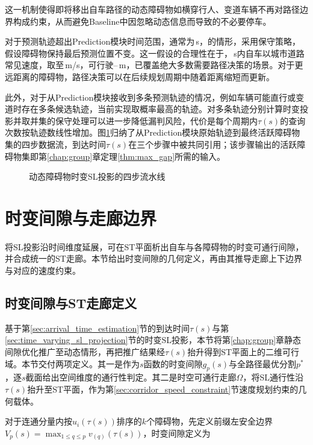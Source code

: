 这一机制使得即将移出自车路径的动态障碍物如横穿行人、变道车辆不再对路径边界构成约束，从而避免Baseline中因忽略动态信息而导致的不必要停车。

对于预测轨迹超出Prediction模块时间范围，通常为\PredictionHorizonSeconds\,s，的情形，采用保守策略，假设障碍物保持最后预测位置不变。这一假设的合理性在于，\PredictionHorizonSeconds\,s内自车以城市道路常见速度，取\CitySpeedMin 至\CitySpeedMax\,m/s，可行驶\PredictionDistanceMin--\PredictionDistanceMax\,m，已覆盖绝大多数需要路径决策的场景。对于更远距离的障碍物，路径决策可以在后续规划周期中随着距离缩短而更新。

此外，对于从Prediction模块接收到多条预测轨迹的情况，例如车辆可能直行或变道时存在多条候选轨迹，当前实现取概率最高的轨迹。对多条轨迹分别计算时变投影并取并集的保守处理可以进一步降低漏判风险，代价是每个周期内$\tau(s)$的查询次数按轨迹数线性增加。图\ref{fig:tvsl_pipeline}归纳了从Prediction模块原始轨迹到最终活跃障碍物集的四步数据流，到达时间$\tau(s)$在三个步骤中被共同引用；该步骤输出的活跃障碍物集即第\ref{chap:group}章定理\ref{thm:max_gap}所需的输入。

\begin{figure}[htbp]
\centering
{}
\caption{动态障碍物时变SL投影的四步流水线}
\label{fig:tvsl_pipeline}
\end{figure}

\section{时变间隙与走廊边界}
将SL投影沿时间维度延展，可在ST平面析出自车与各障碍物的时变可通行间隙，并合成统一的ST走廊。本节给出时变间隙的几何定义，再由其推导走廊上下边界与对应的速度约束。

\subsection{时变间隙与ST走廊定义}
\label{sec:time_varying_corridor_definition}
基于第\ref{sec:arrival_time_estimation}节的到达时间$\tau(s)$与第\ref{sec:time_varying_sl_projection}节的时变SL投影，本节将第\ref{chap:group}章静态间隙优化推广至动态情形，再把推广结果经$\tau(s)$抬升得到ST平面上的二维可行域。本节交付两项定义。其一是作为$s$函数的时变间隙$g_p(s)$与全路径最优分割$p^*$，逐$s$截面给出空间维度的通行性判定。其二是时空可通行走廊$\Omega$，将SL通行性沿$\tau(s)$抬升至ST平面，作为第\ref{sec:corridor_speed_constraint}节速度规划约束的几何载体。

对于连通分量内按$u_i(\tau(s))$排序的$k$个障碍物，先定义前缀左安全边界$V_p(s)=\max_{1\leq q\leq p}v_{(q)}(\tau(s))$，时变间隙定义为


